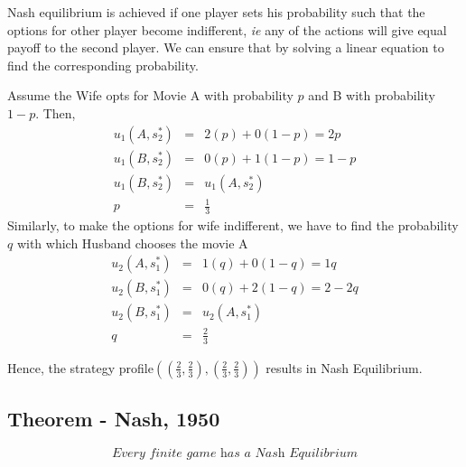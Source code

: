 	Nash equilibrium is achieved if one player sets his probability such that the options for other player become indifferent, \textit{ie} any of the actions will give equal payoff to the second player. We can ensure that by solving a linear equation to find the corresponding probability. 

Assume the Wife opts for Movie A with probability $p$ and B with probability $1-p$. Then,
\begin{eqnarray}
u_1(A, s^*_2) &=& 2 (p) + 0(1-p) = 2p\\
u_1(B, s^*_2) &=& 0 (p) + 1(1-p)= 1-p\\
u_1(B, s^*_2) &=& u_1(A, s^*_2) \\
p &=& \frac{1}{3}
\end{eqnarray}	
Similarly, to make the options for wife indifferent, we have to find the probability $q$ with which Husband chooses the movie A
\begin{eqnarray}
u_2(A, s^*_1) &=& 1 (q) + 0(1-q) = 1q\\
u_2(B, s^*_1) &=& 0 (q) + 2(1-q)= 2 - 2q\\
u_2(B, s^*_1) &=& u_2(A, s^*_1) \\
q &=& \frac{2}{3}
\end{eqnarray}	

Hence, the strategy profile$ \left( \left(\displaystyle{\frac{2}{3}},\displaystyle{\frac{2}{3}}\right),\left(\displaystyle{\frac{2}{3}},\displaystyle{\frac{2}{3}}\right)\right)$ results in Nash Equilibrium.
\subsection{Theorem - Nash, 1950}
$$\textit{Every finite game has a Nash Equilibrium}$$
